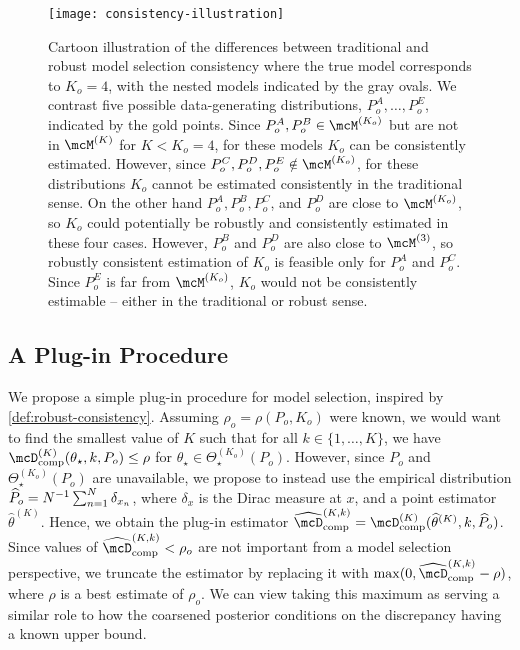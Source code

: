 \begin{figure}[tp]
	\centering
	\texttt{[image: consistency-illustration]}
	\caption{Cartoon illustration of the differences between traditional and robust model selection consistency
		where the true model corresponds to $K_{o} = 4$, with the nested models indicated by the gray ovals.
		We contrast five possible data-generating distributions, $P_{o}^{A}, \dots, P_{o}^{E}$, indicated by
		the gold points.
		Since $P_{o}^{A}, P_{o}^{B} \in \model{K_{o}}$ but are not in $\model{K}$ for $K < K_o = 4$,
		for these models $K_{o}$ can be consistently estimated.
		However,  since $P_{o}^{C}, P_{o}^{D}, P_{o}^{E} \notin \model{K_{o}}$, for these distributions
		$K_{o}$ cannot be estimated consistently in the traditional sense.
		On the other hand $P_{o}^{A}, P_{o}^{B}, P_{o}^{C}$, and $P_{o}^{D}$
		are close to $\model{K_{o}}$,
		so $K_{o}$ could potentially be robustly and consistently estimated in these four cases.
		However, $P_{o}^{B}$ and $P_{o}^{D}$ are also close to $\model{3}$, so robustly consistent
		estimation of $K_{o}$ is feasible only for $P_{o}^{A}$ and $P_{o}^{C}$.
		Since $P_{o}^{E}$ is far from $\model{K_{o}}$, $K_{o}$ would not be consistently estimable --
		either in the traditional or robust sense.
	}
	\label{fig:consistency-illustration}
\end{figure}



\subsection{A Plug-in Procedure}
\label{sec:method}

We propose a simple plug-in procedure for model selection, inspired by \cref{def:robust-consistency}.
Assuming $\rho_o = \rho(P_o, K_o)$ were known, we would want to find the smallest value of $K$ such that 
for all $k \in \{1,\dots,K\}$, we have $\compDisc^{(K)}(\theta_\star, k, P_{o}) \le \rho$ for $\theta_\star \in \Theta_{\star}^{(K_{o})}(P_{o})$.
However, since $P_{o}$ and $\Theta_{\star}^{(K_{o})}(P_{o})$ are unavailable, we propose to instead 
use the empirical distribution $\widehat{P}_o = N^{-1} \sum_{n=1}^N \delta_{x_n}$, where $\delta_x$
is the Dirac measure at $x$, and a point estimator $\widehat\theta^{(K)}$.
Hence, we obtain the plug-in estimator $\compDiscEst^{(K,k)} = \compDisc^{(K)}(\widehat\theta^{(K)}, k, \widehat{P}_o)$.
Since values of $\compDiscEst^{(K,k)} < \rho_o$ are not important from a model selection perspective, 
we truncate the estimator by replacing it with $\max(0, \compDiscEst^{(K,k)} - \rho)$, where $\rho$ is 
a best estimate of $\rho_o$. 
We can view taking this maximum as serving a similar role to how the coarsened posterior conditions on the discrepancy having a known upper bound. 

